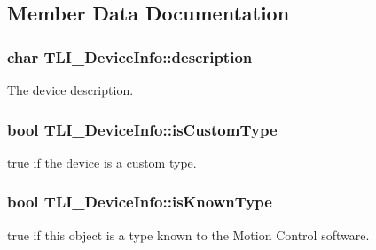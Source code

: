 \subsection{Member Data Documentation}
\subsubsection[{\texorpdfstring{description}{description}}]{\setlength{\rightskip}{0pt plus 5cm}char T\+L\+I\+\_\+\+Device\+Info\+::description}\hypertarget{struct_t_l_i___device_info_a7c6ebe1654de910ad7b6fc4bc6b43d21}{}\label{struct_t_l_i___device_info_a7c6ebe1654de910ad7b6fc4bc6b43d21}


The device description. 

\subsubsection[{\texorpdfstring{is\+Custom\+Type}{isCustomType}}]{\setlength{\rightskip}{0pt plus 5cm}bool T\+L\+I\+\_\+\+Device\+Info\+::is\+Custom\+Type}\hypertarget{struct_t_l_i___device_info_a02a1fa0d7224a387b24757b754d6b880}{}\label{struct_t_l_i___device_info_a02a1fa0d7224a387b24757b754d6b880}


{\ttfamily true} if the device is a custom type. 

\subsubsection[{\texorpdfstring{is\+Known\+Type}{isKnownType}}]{\setlength{\rightskip}{0pt plus 5cm}bool T\+L\+I\+\_\+\+Device\+Info\+::is\+Known\+Type}\hypertarget{struct_t_l_i___device_info_acdc14f666331a4036bda902ffd5bbbc9}{}\label{struct_t_l_i___device_info_acdc14f666331a4036bda902ffd5bbbc9}


{\ttfamily true} if this object is a type known to the Motion Control software. 

